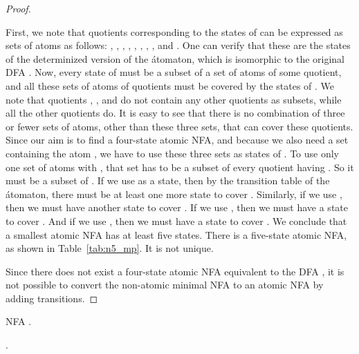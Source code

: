 \documentclass[preprint,12pt]{elsarticle}
\begin{document}
\begin{proof}
\begin{table}[hbt]
\begin{minipage}[b]{0.32\linewidth}
{\begin{center}
\end{center}}
\end{minipage}
\end{table}
First, we note that quotients corresponding to the states of  can be expressed 
as sets of atoms as follows:
, , , ,
, , , , and
. One can verify that these are the states of the determinized 
version of the \'atomaton, which is isomorphic to the original DFA . 
Now, every state of  must be a subset of a set of atoms of some quotient, 
and all these sets of atoms of quotients must be covered by the states of .
We note that quotients , , and 
do not contain any other quotients as subsets, while all the other quotients do.
It is easy to see that there is no combination of three or fewer sets of atoms, 
other than these three sets, that can cover these quotients. 
Since our aim is to find a four-state atomic NFA, and because we also need a set 
containing the atom , we have to use these three sets as states of . 
To use only one set of atoms with , that set has to be
a subset of every quotient having . So it must be
a subset of . If we use  as a state, then by the transition 
table of the \'atomaton, there must be at least one more state to cover 
. Similarly, if we use , then we must have another state to cover 
. If we use , then we must have a state to cover 
. And if we use , then we must have a state to cover 
. We conclude that a smallest atomic NFA has at least five states.
There is a five-state atomic NFA, as 
shown in Table~\ref{tab:n5_mp}. It is not unique. 

Since there does not exist a four-state atomic NFA equivalent to the DFA ,
it is not possible to convert the non-atomic 
minimal NFA  to an atomic NFA by adding transitions.
\end{proof}

\begin{table}[t]
\begin{minipage}[b]{0.3\linewidth}
\caption{NFA .}
\label{tab:n_mp}
{\footnotesize
\begin{center}

\end{center}}
\end{minipage}
\hspace{0.5cm}
\begin{minipage}[b]{0.45\linewidth}
\caption{.}
\label{tab:n5_mp}
{\footnotesize
\begin{center}

\end{center}}
\end{minipage}
\vskip-0.3cm
\end{table}
\end{document}
